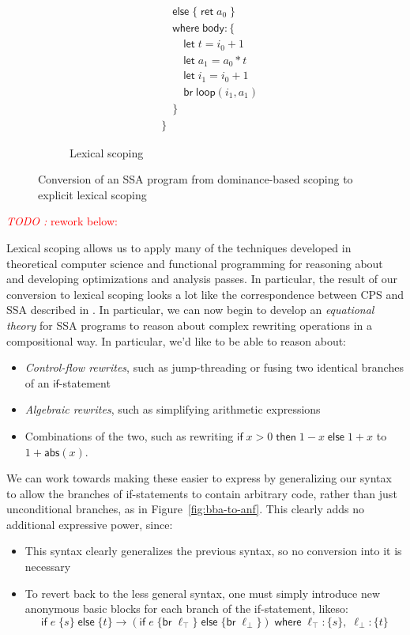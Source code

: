 \documentclass[acmsmall,screen,review]{acmart}
\newcounter{todos}
\newcommand{\TODO}[1]{{
  \stepcounter{todos}
  \begin{center}\large{\textcolor{red}{\emph{TODO \arabic{todos}:} #1}}\end{center}
}}
\newcommand{\ms}[1]{\ensuremath{\mathsf{#1}}}
\begin{document}
\begin{figure}
\begin{subfigure}[t]{.5\textwidth}
\begin{align*}
      & \quad \ms{else}\;\{\;\ms{ret}\;a_0\;\} \\
      & \quad \ms{where}\;\ms{body}: \{\\ 
      & \qquad \ms{let}\;t = i_0 + 1 \\
      & \qquad \ms{let}\;a_1 = a_0 * t \\
      & \qquad \ms{let}\;i_1 = i_0 + 1 \\
      & \qquad \ms{br}\;\ms{loop}(i_1, a_1) \\
      & \quad \} \\
      & \}
    \end{align*}
    \caption{Lexical scoping}
  \end{subfigure}
  \caption{Conversion of an SSA program from dominance-based scoping to explicit lexical scoping}
  \Description{}
  \label{fig:dominance-to-lexical}
\end{figure}

\TODO{rework below:}

Lexical scoping allows us to apply many of the techniques developed in theoretical computer science
and functional programming for reasoning about and developing optimizations and analysis passes. In
particular, the result of our conversion to lexical scoping looks a lot like the correspondence
between CPS and SSA described in \citet{kelsey-95-cps}. In particular, we can now begin to develop
an \textit{equational theory} for SSA programs to reason about complex rewriting operations in a
compositional way. In particular, we'd like to be able to reason about:
\begin{itemize}
  \item \textit{Control-flow rewrites}, such as jump-threading or fusing two identical branches of
  an \ms{if}-statement
  \item \textit{Algebraic rewrites}, such as simplifying arithmetic expressions
  \item Combinations of the two, such as rewriting $\ms{if}\;x > 0\;\ms{then}\;1 - x\;\ms{else}\;1 +
  x$ to $1 + \ms{abs}(x)$.
\end{itemize}

We can work towards making these easier to express by generalizing our syntax to allow the branches
of if-statements to contain arbitrary code, rather than just unconditional branches, as in
Figure~\ref{fig:bba-to-anf}. This clearly adds no additional expressive power, since:
\begin{itemize}
  \item This syntax clearly generalizes the previous syntax, so no conversion into it is necessary
  \item To revert back to the less general syntax, one must simply introduce new anonymous basic
  blocks for each branch of the if-statement, likeso:
  \begin{equation}
    \ms{if}\;e\;\{s\}\;\ms{else}\;\{t\}
    \to (\ms{if}\;e\;\{\ms{br}\;\ell_\top\}\;\ms{else}\;\{\ms{br}\;\ell_\bot\})\;
        \ms{where}\;\ell_\top: \{s\},\;\ell_\bot: \{t\}
  \end{equation}
\end{itemize}
\end{document}
